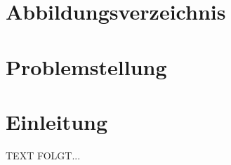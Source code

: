 \documentclass[a4paper,12pt,oneside]{article}
\begin{document}
  \newpage
  
  \tableofcontents
  
  \newpage
  \pagestyle{fancy} %
 
  \section*{Abbildungsverzeichnis}
  \renewcommand{\listfigurename}{} %
  \thispagestyle{empty}
  \listoffigures
  
  \newpage
  
  
  
  \newpage

  \section{Problemstellung}\label{kap_problemstellung}
  
  
  \newpage  
  \section{Einleitung}\label{kap_einleitung}  
   TEXT FOLGT...
   
\end{document}

